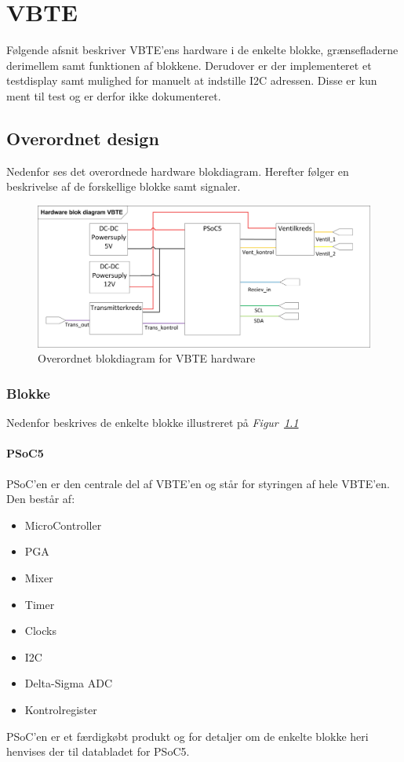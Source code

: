 \chapter{VBTE}
Følgende afsnit beskriver VBTE'ens hardware i de enkelte blokke, grænsefladerne derimellem samt funktionen af blokkene. Derudover er der implementeret et testdisplay samt mulighed for manuelt at indstille I2C adressen. Disse er kun ment til test og er derfor ikke dokumenteret.
\section{Overordnet design}
Nedenfor ses det overordnede hardware blokdiagram. Herefter følger en beskrivelse af de forskellige blokke samt signaler.
\begin{figure}[H]
\centering
\includegraphics[width=1\textwidth]{billeder/HWVBTE}
\caption{Overordnet blokdiagram for VBTE hardware}
\label{fig:HWVBTE}
\end{figure}
\subsection{Blokke}
Nedenfor beskrives de enkelte blokke illustreret på \textit{Figur~\ref{fig:HWVBTE}}
\subsubsection{PSoC5}
PSoC'en er den centrale del af VBTE'en og står for styringen af hele VBTE'en. Den består af:
\begin{itemize}
\item MicroController
\item PGA
\item Mixer
\item Timer
\item Clocks
\item I2C
\item Delta-Sigma ADC
\item Kontrolregister
\end{itemize}
PSoC'en er et færdigkøbt produkt og for detaljer om de enkelte blokke heri henvises der til databladet for PSoC5.
